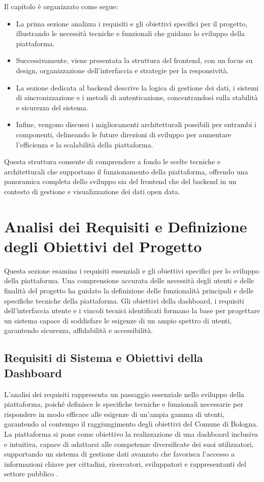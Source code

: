 Il capitolo è organizzato come segue:
\begin{itemize}
    \item La prima sezione analizza i requisiti e gli obiettivi specifici per il progetto, illustrando le necessità tecniche e funzionali che guidano lo sviluppo della piattaforma.
    \item Successivamente, viene presentata la struttura del frontend, con un focus su design, organizzazione dell’interfaccia e strategie per la responsività.
    \item La sezione dedicata al backend descrive la logica di gestione dei dati, i sistemi di sincronizzazione e i metodi di autenticazione, concentrandosi sulla stabilità e sicurezza del sistema.
    \item Infine, vengono discussi i miglioramenti architetturali possibili per entrambi i componenti, delineando le future direzioni di sviluppo per aumentare l’efficienza e la scalabilità della piattaforma.
\end{itemize}

Questa struttura consente di comprendere a fondo le scelte tecniche e architetturali che supportano il funzionamento della piattaforma, offrendo una panoramica completa dello sviluppo sia del frontend che del backend in un contesto di gestione e visualizzazione dei dati open data.

\section{Analisi dei Requisiti e Definizione degli Obiettivi del Progetto}
Questa sezione esamina i requisiti essenziali e gli obiettivi specifici per lo sviluppo della piattaforma. Una comprensione accurata delle necessità degli utenti e delle finalità del progetto ha guidato la definizione delle funzionalità principali e delle specifiche tecniche della piattaforma. Gli obiettivi della dashboard, i requisiti dell’interfaccia utente e i vincoli tecnici identificati formano la base per progettare un sistema capace di soddisfare le esigenze di un ampio spettro di utenti, garantendo sicurezza, affidabilità e accessibilità.

\subsection{Requisiti di Sistema e Obiettivi della Dashboard}

L'analisi dei requisiti rappresenta un passaggio essenziale nello sviluppo della piattaforma, poiché definisce le specifiche tecniche e funzionali necessarie per rispondere in modo efficace alle esigenze di un'ampia gamma di utenti, garantendo al contempo il raggiungimento degli obiettivi del Comune di Bologna. La piattaforma si pone come obiettivo la realizzazione di una dashboard inclusiva e intuitiva, capace di adattarsi alle competenze diversificate dei suoi utilizzatori, supportando un sistema di gestione dati avanzato che favorisca l’accesso a informazioni chiave per cittadini, ricercatori, sviluppatori e rappresentanti del settore pubblico \cite{nielsen1994, cooper2014}.

